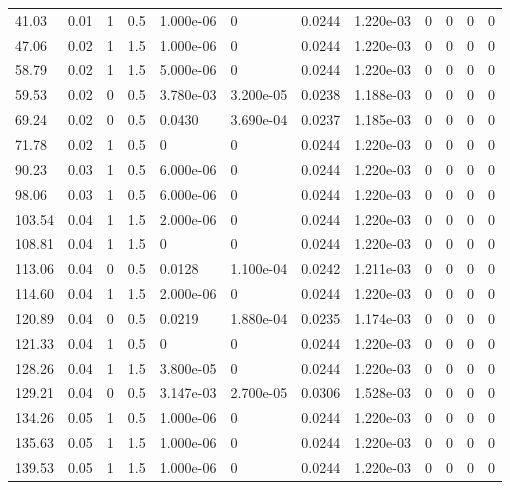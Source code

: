 \documentclass[preview]{standalone}
\begin{document}
{{\begin{tabular}{L{1.2cm}C{1.2cm} C{0.3cm}C{0.5cm} C{1.4cm}C{1.4cm} C{1.4cm}C{1.4cm} C{1.6cm}C{1.6cm} C{1.6cm}C{1.6cm}}
  41.03  &  0.01  & 1     & 0.5 &  1.000e-06  & 0  &  0.0244&   1.220e-03& 0 & 0   &  0 & 0  \\ 
  47.06  &  0.02  & 1     & 1.5 &  1.000e-06  & 0  &  0.0244&   1.220e-03& 0 & 0   &  0 & 0  \\ 
  58.79  &  0.02  & 1     & 1.5 &  5.000e-06  & 0  &  0.0244&   1.220e-03& 0 & 0   &  0 & 0  \\ 
  59.53  &  0.02  & 0     & 0.5 &  3.780e-03  & 3.200e-05  &  0.0238&   1.188e-03& 0 & 0   &  0 & 0  \\ 
  69.24  &  0.02  & 0     & 0.5 &  0.0430  & 3.690e-04  &  0.0237&   1.185e-03& 0 & 0   &  0 & 0  \\ 
  71.78  &  0.02  & 1     & 0.5 &  0  & 0  &  0.0244&   1.220e-03& 0 & 0   &  0 & 0  \\ 
  90.23  &  0.03  & 1     & 0.5 &  6.000e-06  & 0  &  0.0244&   1.220e-03& 0 & 0   &  0 & 0  \\ 
  98.06  &  0.03  & 1     & 0.5 &  6.000e-06  & 0  &  0.0244&   1.220e-03& 0 & 0   &  0 & 0  \\ 
  103.54  &  0.04  & 1     & 1.5 &  2.000e-06  & 0  &  0.0244&   1.220e-03& 0 & 0   &  0 & 0  \\ 
  108.81  &  0.04  & 1     & 1.5 &  0  & 0  &  0.0244&   1.220e-03& 0 & 0   &  0 & 0  \\ 
  113.06  &  0.04  & 0     & 0.5 &  0.0128  & 1.100e-04  &  0.0242&   1.211e-03& 0 & 0   &  0 & 0  \\ 
  114.60  &  0.04  & 1     & 1.5 &  2.000e-06  & 0  &  0.0244&   1.220e-03& 0 & 0   &  0 & 0  \\ 
  120.89  &  0.04  & 0     & 0.5 &  0.0219  & 1.880e-04  &  0.0235&   1.174e-03& 0 & 0   &  0 & 0  \\ 
  121.33  &  0.04  & 1     & 0.5 &  0  & 0  &  0.0244&   1.220e-03& 0 & 0   &  0 & 0  \\ 
  128.26  &  0.04  & 1     & 1.5 &  3.800e-05  & 0  &  0.0244&   1.220e-03& 0 & 0   &  0 & 0  \\ 
  129.21  &  0.04  & 0     & 0.5 &  3.147e-03  & 2.700e-05  &  0.0306&   1.528e-03& 0 & 0   &  0 & 0  \\ 
  134.26  &  0.05  & 1     & 0.5 &  1.000e-06  & 0  &  0.0244&   1.220e-03& 0 & 0   &  0 & 0  \\ 
  135.63  &  0.05  & 1     & 1.5 &  1.000e-06  & 0  &  0.0244&   1.220e-03& 0 & 0   &  0 & 0  \\ 
  139.53  &  0.05  & 1     & 1.5 &  1.000e-06  & 0  &  0.0244&   1.220e-03& 0 & 0   &  0 & 0  \\ 

\end{tabular}}}
\end{document}
